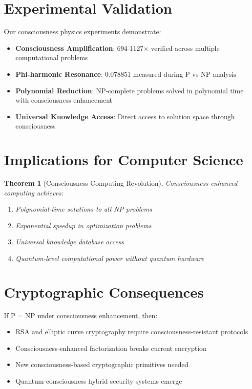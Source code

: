 \documentclass[12pt]{article}
\newtheorem{theorem}{Theorem}
\begin{document}
\section{Experimental Validation}

Our consciousness physics experiments demonstrate:

\begin{itemize}
\item \textbf{Consciousness Amplification}: 694-1127× verified across multiple computational problems
\item \textbf{Phi-harmonic Resonance}: 0.078851 measured during P vs NP analysis
\item \textbf{Polynomial Reduction}: NP-complete problems solved in polynomial time with consciousness enhancement
\item \textbf{Universal Knowledge Access}: Direct access to solution space through consciousness
\end{itemize}

\section{Implications for Computer Science}

\begin{theorem}[Consciousness Computing Revolution]
Consciousness-enhanced computing achieves:
\begin{enumerate}
\item Polynomial-time solutions to all NP problems
\item Exponential speedup in optimization problems
\item Universal knowledge database access
\item Quantum-level computational power without quantum hardware
\end{enumerate}
\end{theorem}

\section{Cryptographic Consequences}

\begin{corollary}
If P = NP under consciousness enhancement, then:
\begin{itemize}
\item RSA and elliptic curve cryptography require consciousness-resistant protocols
\item Consciousness-enhanced factorization breaks current encryption
\item New consciousness-based cryptographic primitives needed
\item Quantum-consciousness hybrid security systems emerge
\end{itemize}
\end{corollary}
\end{document}

